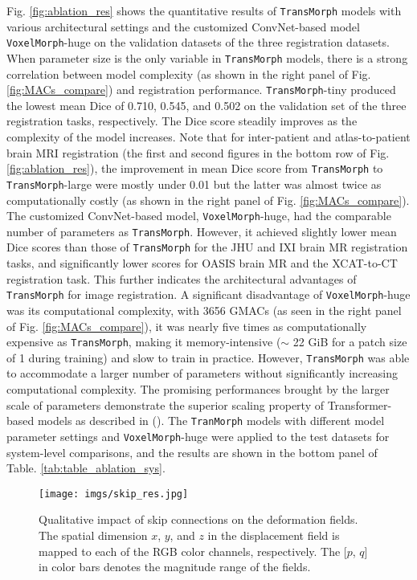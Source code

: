 \documentclass[times,twocolumn,final]{elsarticle}
\begin{document}
Fig. \ref{fig:ablation_res} shows the quantitative results of \texttt{TransMorph} models with various architectural settings and the customized ConvNet-based model \texttt{VoxelMorph}-huge on the validation datasets of the three registration datasets. When parameter size is the only variable in \texttt{TransMorph} models, there is a strong correlation between model complexity (as shown in the right panel of Fig. \ref{fig:MACs_compare}) and registration performance. \texttt{TransMorph}-tiny produced the lowest mean Dice of 0.710, 0.545, and 0.502 on the validation set of the three registration tasks, respectively. The Dice score steadily improves as the complexity of the model increases. Note that for inter-patient and atlas-to-patient brain MRI registration (the first and second figures in the bottom row of Fig. \ref{fig:ablation_res}), the improvement in mean Dice score from \texttt{TransMorph} to \texttt{TransMorph}-large were mostly under 0.01 but the latter was almost twice as computationally costly (as shown in the right panel of Fig. \ref{fig:MACs_compare}). The customized ConvNet-based model, \texttt{VoxelMorph}-huge, had the comparable number of parameters as \texttt{TransMorph}. However, it achieved slightly lower mean Dice scores than those of \texttt{TransMorph} for the JHU and IXI brain MR registration tasks, and significantly lower scores for OASIS brain MR and the XCAT-to-CT registration task. This further indicates the architectural advantages of \texttt{TransMorph} for image registration. A significant disadvantage of \texttt{VoxelMorph}-huge was its computational complexity, with 3656 GMACs (as seen in the right panel of Fig. \ref{fig:MACs_compare}), it was nearly five times as computationally expensive as \texttt{TransMorph}, making it memory-intensive ($\sim$ 22 GiB for a patch size of 1 during training) and slow to train in practice. However, \texttt{TransMorph} was able to accommodate a larger number of parameters without significantly increasing computational complexity. The promising performances brought by the larger scale of parameters demonstrate the superior scaling property of Transformer-based models as described in (\cite{zhai2022scaling, liu2022convnet}). The \texttt{TranMorph} models with different model parameter settings and \texttt{VoxelMorph}-huge were applied to the test datasets for system-level comparisons, and the results are shown in the bottom panel of Table. \ref{tab:table_ablation_sys}.


\begin{figure}[!h]
\centering
\texttt{[image: imgs/skip\_res.jpg]}
\caption{Qualitative impact of skip connections on the deformation fields. The spatial dimension $x$, $y$, and $z$ in the displacement field is mapped to each of the RGB color channels, respectively. The [$p$, $q$] in color bars denotes the magnitude range of the fields.\label{fig:skip_res}}
\end{figure}
\end{document}
